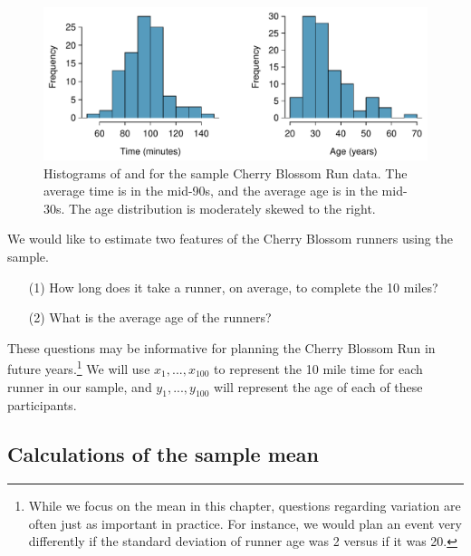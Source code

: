 \begin{figure}[H]
\centering
\includegraphics[width=\textwidth]{04-5/figures/run10SampHistograms/run10SampHistograms} 
\caption{Histograms of  and  for the sample Cherry Blossom Run data. The average time is in the mid-90s, and the average age is in the mid-30s. The age distribution is moderately skewed to the right.}
\label{run10SampHistograms}
\end{figure}








We would like to estimate two features of the Cherry Blossom runners using the sample. 
\begin{itemize}
\setlength{\itemsep}{0mm}
\item[(1)] How long does it take a runner, on average, to complete the 10 miles?
\item[(2)] What is the average age of the runners?
\end{itemize}
These questions may be informative for planning the Cherry Blossom Run in future years.\footnote{While we focus on the mean in this chapter, questions regarding variation are often just as important in practice. For instance, we would plan an event very differently if the standard deviation of runner age was 2 versus if it was 20.} We will use $x_1, ..., x_{100}$ to represent the 10 mile time for each runner in our sample, and $y_1, ..., y_{100}$ will represent the age of each of these participants.

\subsection{Calculations of the sample mean}
\label{pointEstimates}


